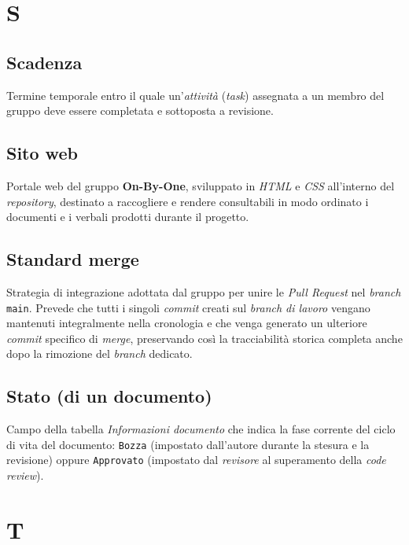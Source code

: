 \documentclass[11pt, a4paper]{article}
\begin{document}
\newpage

\section*{S}

\subsection*{Scadenza}
Termine temporale entro il quale un'\textit{attività} (\textit{task}) assegnata a un membro del gruppo deve essere completata e sottoposta a revisione.

\subsection*{Sito web}
Portale web del gruppo \textbf{On-By-One}, sviluppato in \textit{HTML} e \textit{CSS} all'interno del \textit{repository}, destinato a raccogliere e rendere consultabili in modo ordinato i documenti e i verbali prodotti durante il progetto.

\subsection*{Standard merge}
Strategia di integrazione adottata dal gruppo per unire le \textit{Pull Request} nel \textit{branch} \texttt{main}. Prevede che tutti i singoli \textit{commit} creati sul \textit{branch di lavoro} vengano mantenuti integralmente nella cronologia e che venga generato un ulteriore \textit{commit} specifico di \textit{merge}, preservando così la tracciabilità storica completa anche dopo la rimozione del \textit{branch} dedicato.

\subsection*{Stato (di un documento)}
Campo della tabella \textit{Informazioni documento} che indica la fase corrente del ciclo di vita del documento: \texttt{Bozza} (impostato dall'autore durante la stesura e la revisione) oppure \texttt{Approvato} (impostato dal \textit{revisore} al superamento della \textit{code review}).

\section*{T}
\end{document}
